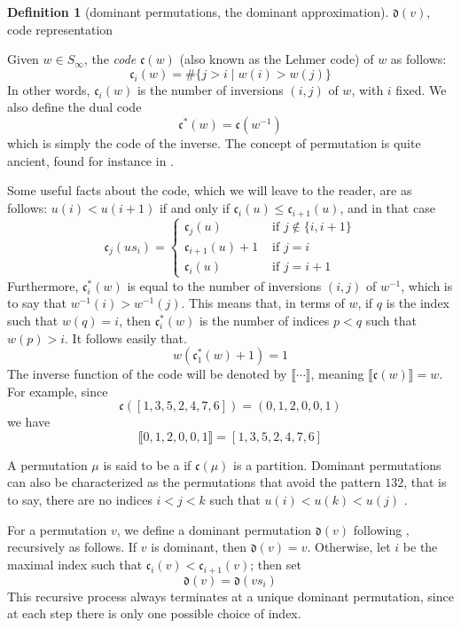 \documentclass{amsart}
\theoremstyle{definition}
\newtheorem{definition}[lemma]{Definition}
\theoremstyle{remark}
\numberwithin{equation}{subsection}
\newcommand{\cperm}[1]{\llbracket #1\rrbracket}
\newcommand{\dom}{\mathfrak{d}}
\newcommand{\code}{\mathfrak{c}}
\begin{document}
	\begin{definition}[dominant permutations, the dominant approximation] $\dom(v)$, code representation \label{definition:codestuff}
		
        Given $w\in S_\infty$, the \emph{code} $\code(w)$ (also known as the Lehmer code) of $w$ as follows:
		$$\code_i(w)=\#\{j> i\mid w(i)>w(j)\}$$
		In other words, $\code_i(w)$ is the number of inversions $(i,j)$ of $w$, with $i$ fixed. We also define the dual code
		$$\code^*(w)=\code(w^{-1})$$
		which is simply the code of the inverse. The concept of permutation is quite ancient, found for instance in \cite{laisant1888numeration}.
		
		Some useful facts about the code, which we will leave to the reader, are as follows: $u(i)<u(i+1)$ if and only if $\code_i(u)\leq\code_{i+1}(u)$, and in that case
		$$\code_j(us_i)=\begin{cases}
			\code_j(u)&\mbox{ if }j\notin \{i,i+1\}\\
			\code_{i+1}(u)+1&\mbox{ if }j=i\\
			\code_i(u)&\mbox{ if }j=i+1
		\end{cases}$$
		Furthermore, $\code^*_i(w)$ is equal to the number of inversions $(i,j)$ of $w^{-1}$, which is to say that $w^{-1}(i)>w^{-1}(j)$. This means that, in terms of $w$, if $q$ is the index such that $w(q)=i$, then $\code^*_i(w)$ is the number of indices $p<q$ such that $w(p)>i$. It follows easily that.
		$$w(\code^*_1(w)+1)=1$$
		The inverse function of the code will be denoted by $\cperm{\cdots}$, meaning $\cperm{\code(w)}=w$. For example, since
		$$\code([1,3,5,2,4,7,6]) = (0,1,2,0,0,1)$$
		we have
		$$\cperm{0,1,2,0,0,1}=[1,3,5,2,4,7,6]$$
		
		A permutation $\mu$ is said to be a if $\code(\mu)$ is a partition. Dominant permutations can also be characterized as the permutations that avoid the pattern $132$, that is to say, there are no indices $i<j<k$ such that $u(i)<u(k)<u(j)$ \cite{reif}.
		
		For a permutation $v$, we define a dominant permutation $\dom(v)$ following \cite{samuelmolev}, recursively as follows. If $v$ is dominant, then $\dom(v)=v$. Otherwise, let $i$ be the maximal index such that $\code_i(v)<\code_{i+1}(v)$; then set
		$$\dom(v)=\dom(vs_i)$$
		This recursive process always terminates at a unique dominant permutation, since at each step there is only one possible choice of index.
	\end{definition}
	
\end{document}
